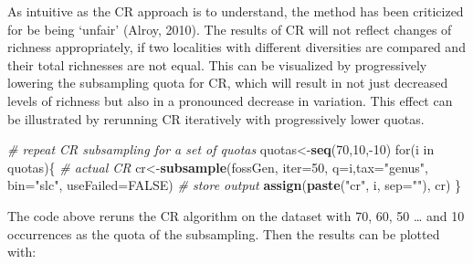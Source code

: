 \documentclass[]{article}
\newenvironment{Shaded}{\begin{snugshade}}{\end{snugshade}}
\newcommand{\KeywordTok}[1]{\textcolor[rgb]{0.13,0.29,0.53}{\textbf{{#1}}}}
\newcommand{\DataTypeTok}[1]{\textcolor[rgb]{0.13,0.29,0.53}{{#1}}}
\newcommand{\DecValTok}[1]{\textcolor[rgb]{0.00,0.00,0.81}{{#1}}}
\newcommand{\StringTok}[1]{\textcolor[rgb]{0.31,0.60,0.02}{{#1}}}
\newcommand{\CommentTok}[1]{\textcolor[rgb]{0.56,0.35,0.01}{\textit{{#1}}}}
\newcommand{\OtherTok}[1]{\textcolor[rgb]{0.56,0.35,0.01}{{#1}}}
\newcommand{\NormalTok}[1]{{#1}}
\begin{document}
As intuitive as the CR approach is to understand, the method has been
criticized for be being `unfair' (Alroy, 2010). The results of CR will
not reflect changes of richness appropriately, if two localities with
different diversities are compared and their total richnesses are not
equal. This can be visualized by progressively lowering the subsampling
quota for CR, which will result in not just decreased levels of richness
but also in a pronounced decrease in variation. This effect can be
illustrated by rerunning CR iteratively with progressively lower quotas.

\begin{Shaded}
\begin{Highlighting}[]
\CommentTok{# repeat CR subsampling for a set of quotas}
\NormalTok{quotas<-}\KeywordTok{seq}\NormalTok{(}\DecValTok{70}\NormalTok{,}\DecValTok{10}\NormalTok{,-}\DecValTok{10}\NormalTok{)}
\NormalTok{for(i in quotas)\{}
   \CommentTok{# actual CR }
   \NormalTok{cr<-}\KeywordTok{subsample}\NormalTok{(fossGen, }\DataTypeTok{iter=}\DecValTok{50}\NormalTok{, }\DataTypeTok{q=}\NormalTok{i,}\DataTypeTok{tax=}\StringTok{"genus"}\NormalTok{, }\DataTypeTok{bin=}\StringTok{"slc"}\NormalTok{, }
    \DataTypeTok{useFailed=}\OtherTok{FALSE}\NormalTok{)}
  \CommentTok{# store output}
  \KeywordTok{assign}\NormalTok{(}\KeywordTok{paste}\NormalTok{(}\StringTok{"cr"}\NormalTok{, i, }\DataTypeTok{sep=}\StringTok{""}\NormalTok{), cr)}
\NormalTok{\}}
\end{Highlighting}
\end{Shaded}

The code above reruns the CR algorithm on the dataset with 70, 60, 50
\ldots{} and 10 occurrences as the quota of the subsampling. Then the
results can be plotted with:

\begin{Shaded}
\end{Shaded}
\end{document}
